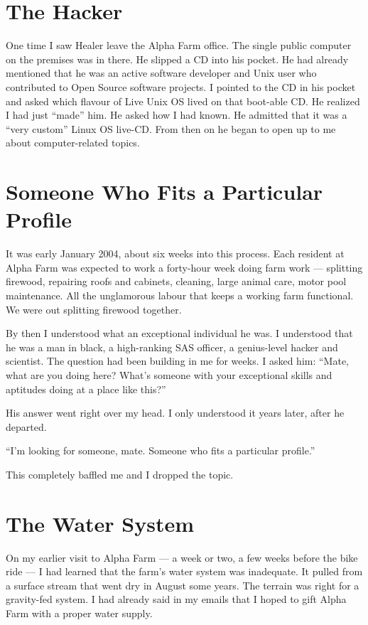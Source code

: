 \section*{The Hacker}
\label{record:af-the-hacker}

One time I saw Healer leave the Alpha Farm office. The single public computer on the premises was in there. He slipped a CD into his pocket. He had already mentioned that he was an active software developer and Unix user who contributed to Open Source software projects. I pointed to the CD in his pocket and asked which flavour of Live Unix OS lived on that boot-able CD. He realized I had just ``made'' him. He asked how I had known. He admitted that it was a ``very custom'' Linux OS live-CD. From then on he began to open up to me about computer-related topics.

\section*{Someone Who Fits a Particular Profile}
\label{record:af-someone-who-fits-a-particular-profile}

It was early January 2004, about six weeks into this process. Each resident at Alpha Farm was expected to work a forty-hour week doing farm work --- splitting firewood, repairing roofs and cabinets, cleaning, large animal care, motor pool maintenance. All the unglamorous labour that keeps a working farm functional. We were out splitting firewood together.

By then I understood what an exceptional individual he was. I understood that he was a man in black, a high-ranking SAS officer, a genius-level hacker and scientist. The question had been building in me for weeks. I asked him: ``Mate, what are you doing here? What's someone with your exceptional skills and aptitudes doing at a place like this?''

His answer went right over my head. I only understood it years later, after he departed.

``I'm looking for someone, mate. Someone who fits a particular profile.''

This completely baffled me and I dropped the topic.

\section*{The Water System}
\label{record:af-the-water-system}

On my earlier visit to Alpha Farm --- a week or two, a few weeks before the bike ride --- I had learned that the farm's water system was inadequate. It pulled from a surface stream that went dry in August some years. The terrain was right for a gravity-fed system. I had already said in my emails that I hoped to gift Alpha Farm with a proper water supply.

